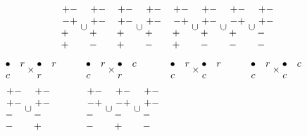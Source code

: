 \documentclass[11pt ,reqno]{amsart}
\begin{document}
\begin{example}
$$\begin{aligned}
&&\mat +-\\-+\\+\quad\\+\quad\emat\cup\mat +-\\+-\\+\quad\\-\quad\emat
&&\mat +-\\+-\\+\quad\\+\quad\emat\cup\mat +-\\+-\\+\quad\\-\quad\emat
&&\mat +-\\-+\\+\quad\\+\quad\emat\cup\mat +-\\+-\\+\quad\\-\quad\emat
\cup\mat +-\\-+\\+\quad\\-\quad\emat\cup\mat +-\\+-\\-\quad\\-\quad\emat
\end{aligned}
$$
$$
\begin{aligned}
&\mat\bullet&r\\ c\emat\times\mat\bullet&r\\ r\emat\qquad
&&\mat\bullet&r\\ c\emat\times\mat\bullet&c\\ r\emat\qquad
&&\mat\bullet&r\\ c\emat\times\mat\bullet&r\\ c\emat\qquad
&&\mat\bullet&r\\ c\emat\times\mat\bullet&c \\ c\emat\qquad\\
&\mat +-\\+-\\-\quad\\-\quad\emat\cup\mat +-\\+-\\-\quad\\+\quad\emat
&&\mat +-\\-+\\-\quad\\-\quad\emat\cup\mat +-\\-+\\-\quad\\+\quad\emat\cup
\mat +-\\+-\\-\quad\\-\quad\emat

\end{aligned}$$
\end{example}
\end{document}
